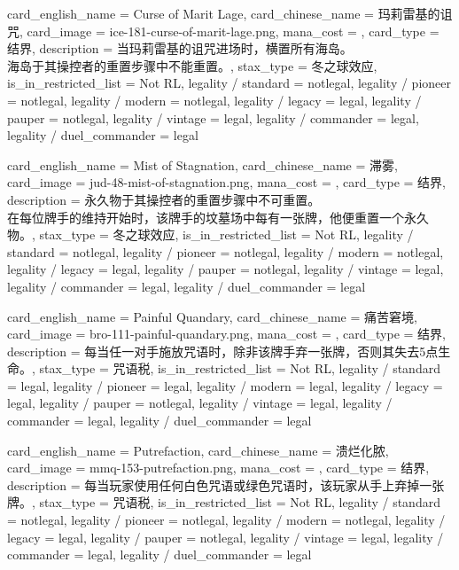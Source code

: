 \documentclass[lang = cn, color = black, 10pt]{AllThatStax}
\begin{document}
\card
{
	card_english_name = {Curse of Marit Lage},
	card_chinese_name = {玛莉雷基的诅咒},
	card_image = ice-181-curse-of-marit-lage.png,
	mana_cost = ,
	card_type = 结界,
	description = {当玛莉雷基的诅咒进场时，横置所有海岛。\\
海岛于其操控者的重置步骤中不能重置。},
	stax_type = 冬之球效应,
	is_in_restricted_list = Not RL,
	legality / standard = notlegal,
	legality / pioneer = notlegal,
	legality / modern = notlegal,
	legality / legacy = legal,
	legality / pauper = notlegal,
	legality / vintage = legal,
	legality / commander = legal,
	legality / duel_commander = legal
}

\card
{
	card_english_name = {Mist of Stagnation},
	card_chinese_name = {滞雾},
	card_image = jud-48-mist-of-stagnation.png,
	mana_cost = ,
	card_type = 结界,
	description = {永久物于其操控者的重置步骤中不可重置。\\
在每位牌手的维持开始时，该牌手的坟墓场中每有一张牌，他便重置一个永久物。},
	stax_type = 冬之球效应,
	is_in_restricted_list = Not RL,
	legality / standard = notlegal,
	legality / pioneer = notlegal,
	legality / modern = notlegal,
	legality / legacy = legal,
	legality / pauper = notlegal,
	legality / vintage = legal,
	legality / commander = legal,
	legality / duel_commander = legal
}

\card
{
	card_english_name = {Painful Quandary},
	card_chinese_name = {痛苦窘境},
	card_image = bro-111-painful-quandary.png,
	mana_cost = ,
	card_type = 结界,
	description = {每当任一对手施放咒语时，除非该牌手弃一张牌，否则其失去5点生命。},
	stax_type = 咒语税,
	is_in_restricted_list = Not RL,
	legality / standard = legal,
	legality / pioneer = legal,
	legality / modern = legal,
	legality / legacy = legal,
	legality / pauper = notlegal,
	legality / vintage = legal,
	legality / commander = legal,
	legality / duel_commander = legal
}

\card
{
	card_english_name = {Putrefaction},
	card_chinese_name = {溃烂化脓},
	card_image = mmq-153-putrefaction.png,
	mana_cost = ,
	card_type = 结界,
	description = {每当玩家使用任何白色咒语或绿色咒语时，该玩家从手上弃掉一张牌。},
	stax_type = 咒语税,
	is_in_restricted_list = Not RL,
	legality / standard = notlegal,
	legality / pioneer = notlegal,
	legality / modern = notlegal,
	legality / legacy = legal,
	legality / pauper = notlegal,
	legality / vintage = legal,
	legality / commander = legal,
	legality / duel_commander = legal
}
\end{document}
